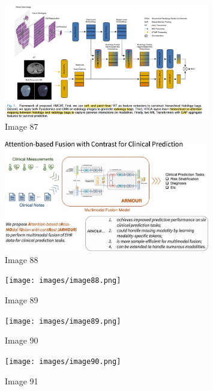 \documentclass{article}%
\begin{document}
%


\begin{figure}[h!]%
\centering%
\includegraphics[width=0.8\textwidth]{images/image86.png}%
\caption{Image 87}%
\end{figure}

%


\begin{figure}[h!]%
\centering%
\includegraphics[width=0.8\textwidth]{images/image87.png}%
\caption{Image 88}%
\end{figure}

%


\begin{figure}[h!]%
\centering%
\texttt{[image: images/image88.png]}%
\caption{Image 89}%
\end{figure}

%


\begin{figure}[h!]%
\centering%
\texttt{[image: images/image89.png]}%
\caption{Image 90}%
\end{figure}

%


\begin{figure}[h!]%
\centering%
\texttt{[image: images/image90.png]}%
\caption{Image 91}%
\end{figure}

%
\end{document}
